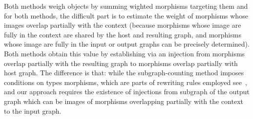Both methods weigh objects by summing wighted morphisms targeting them and
for both methods, the difficult part is to estimate the weight of morphisms whose images overlap partially with the context (because morphisms whose image are fully in the context are shared by the host and resulting graph, and morphisms whose image are fully in the input or output graphs can be precisely determined). Both methods obtain this value by establishing via an injection from morphisms overlap partially with the resulting graph to morphisms overlap partially with host graph.
The difference is that:
while the subgraph-counting method imposes conditions on types morphisms, which are parts of rewriting rules employed see~\cite[page 9 bottom, remark 4.11 and Lemma 4.23]{overbeek2023termination}, and our approach requires the existence of injections from subgraph of the output graph which can be images of morphisms overlapping partially with the context to the input graph. 

